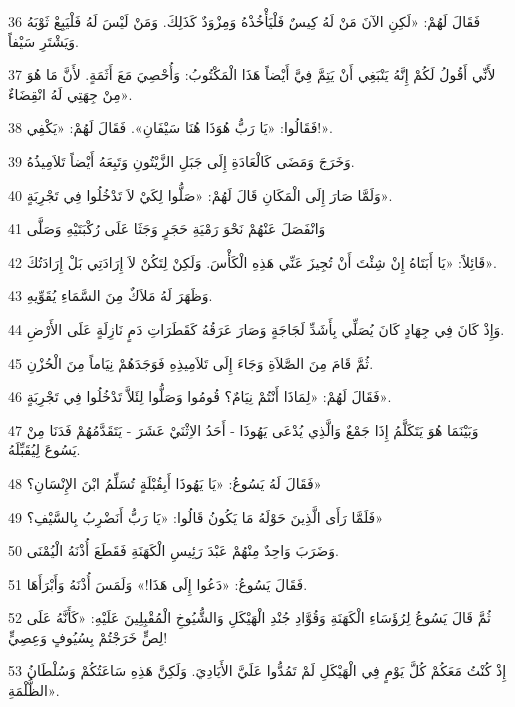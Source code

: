 \par 36 فَقَالَ لَهُمْ: «لَكِنِ الآنَ مَنْ لَهُ كِيسٌ فَلْيَأْخُذْهُ وَمِزْوَدٌ كَذَلِكَ. وَمَنْ لَيْسَ لَهُ فَلْيَبِعْ ثَوْبَهُ وَيَشْتَرِ سَيْفاً.
\par 37 لأَنِّي أَقُولُ لَكُمْ إِنَّهُ يَنْبَغِي أَنْ يَتِمَّ فِيَّ أَيْضاً هَذَا الْمَكْتُوبُ: وَأُحْصِيَ مَعَ أَثَمَةٍ. لأَنَّ مَا هُوَ مِنْ جِهَتِي لَهُ انْقِضَاءٌ».
\par 38 فَقَالُوا: «يَا رَبُّ هُوَذَا هُنَا سَيْفَانِ». فَقَالَ لَهُمْ: «يَكْفِي!».
\par 39 وَخَرَجَ وَمَضَى كَالْعَادَةِ إِلَى جَبَلِ الزَّيْتُونِ وَتَبِعَهُ أَيْضاً تَلاَمِيذُهُ.
\par 40 وَلَمَّا صَارَ إِلَى الْمَكَانِ قَالَ لَهُمْ: «صَلُّوا لِكَيْ لاَ تَدْخُلُوا فِي تَجْرِبَةٍ».
\par 41 وَانْفَصَلَ عَنْهُمْ نَحْوَ رَمْيَةِ حَجَرٍ وَجَثَا عَلَى رُكْبَتَيْهِ وَصَلَّى
\par 42 قَائِلاً: «يَا أَبَتَاهُ إِنْ شِئْتَ أَنْ تُجِيزَ عَنِّي هَذِهِ الْكَأْسَ. وَلَكِنْ لِتَكُنْ لاَ إِرَادَتِي بَلْ إِرَادَتُكَ».
\par 43 وَظَهَرَ لَهُ مَلاَكٌ مِنَ السَّمَاءِ يُقَوِّيهِ.
\par 44 وَإِذْ كَانَ فِي جِهَادٍ كَانَ يُصَلِّي بِأَشَدِّ لَجَاجَةٍ وَصَارَ عَرَقُهُ كَقَطَرَاتِ دَمٍ نَازِلَةٍ عَلَى الأَرْضِ.
\par 45 ثُمَّ قَامَ مِنَ الصَّلاَةِ وَجَاءَ إِلَى تَلاَمِيذِهِ فَوَجَدَهُمْ نِيَاماً مِنَ الْحُزْنِ.
\par 46 فَقَالَ لَهُمْ: «لِمَاذَا أَنْتُمْ نِيَامٌ؟ قُومُوا وَصَلُّوا لِئَلاَّ تَدْخُلُوا فِي تَجْرِبَةٍ».
\par 47 وَبَيْنَمَا هُوَ يَتَكَلَّمُ إِذَا جَمْعٌ وَالَّذِي يُدْعَى يَهُوذَا - أَحَدُ الاِثْنَيْ عَشَرَ - يَتَقَدَّمُهُمْ فَدَنَا مِنْ يَسُوعَ لِيُقَبِّلَهُ.
\par 48 فَقَالَ لَهُ يَسُوعُ: «يَا يَهُوذَا أَبِقُبْلَةٍ تُسَلِّمُ ابْنَ الإِنْسَانِ؟»
\par 49 فَلَمَّا رَأَى الَّذِينَ حَوْلَهُ مَا يَكُونُ قَالُوا: «يَا رَبُّ أَنَضْرِبُ بِالسَّيْفِ؟»
\par 50 وَضَرَبَ وَاحِدٌ مِنْهُمْ عَبْدَ رَئِيسِ الْكَهَنَةِ فَقَطَعَ أُذْنَهُ الْيُمْنَى.
\par 51 فَقَالَ يَسُوعُ: «دَعُوا إِلَى هَذَا!» وَلَمَسَ أُذْنَهُ وَأَبْرَأَهَا.
\par 52 ثُمَّ قَالَ يَسُوعُ لِرُؤَسَاءِ الْكَهَنَةِ وَقُوَّادِ جُنْدِ الْهَيْكَلِ وَالشُّيُوخِ الْمُقْبِلِينَ عَلَيْهِ: «كَأَنَّهُ عَلَى لِصٍّ خَرَجْتُمْ بِسُيُوفٍ وَعِصِيٍّ!
\par 53 إِذْ كُنْتُ مَعَكُمْ كُلَّ يَوْمٍ فِي الْهَيْكَلِ لَمْ تَمُدُّوا عَلَيَّ الأَيَادِيَ. وَلَكِنَّ هَذِهِ سَاعَتُكُمْ وَسُلْطَانُ الظُّلْمَةِ».
